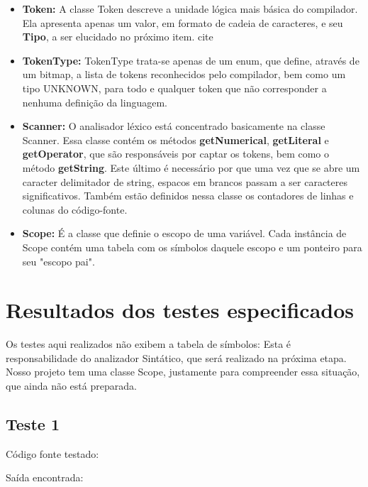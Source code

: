 \documentclass[11pt]{article}
\begin{document}
		
		\begin{itemize}
			
			\item \textbf{Token: }A classe Token descreve a unidade lógica mais básica do compilador. Ela apresenta apenas um valor, em formato de cadeia de caracteres, e seu \textbf{Tipo}, a ser elucidado no próximo item. 
			cite
			\item \textbf{TokenType: } TokenType trata-se apenas de um enum, que define, através de um bitmap, a lista de tokens reconhecidos pelo compilador, bem como um tipo UNKNOWN, para todo e qualquer token que não corresponder a nenhuma definição da linguagem.
			
			\item \textbf{Scanner: } O analisador léxico está concentrado basicamente na classe Scanner. Essa classe contém os métodos \textbf{getNumerical}, \textbf{getLiteral} e \textbf{getOperator}, que são responsáveis por captar os tokens, bem como o método \textbf{getString}. Este último é necessário por que uma vez que se abre um caracter delimitador de string, espacos em brancos passam a ser caracteres significativos. Também estão definidos nessa classe os contadores de linhas e colunas do código-fonte.
			
			\item \textbf{Scope: } É a classe que definie o escopo de uma variável. Cada instância de Scope contém uma tabela com os símbolos daquele escopo e um ponteiro para seu "escopo pai". 
		
		\end{itemize}
		

\newpage
\section{Resultados dos testes especificados}

	Os testes aqui realizados não exibem a tabela de símbolos: Esta é responsabilidade do analizador Sintático, que será realizado na próxima etapa.
	Nosso projeto tem uma classe Scope, justamente para compreender essa situação, que ainda não está preparada.


	\subsection{Teste 1}
	
		Código fonte testado:
		
			
		Saída encontrada:
		
	
\end{document}
